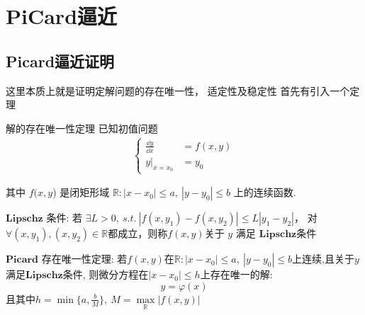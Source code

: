 \newpage
\section{PiCard逼近}
\subsection{Picard逼近证明}

这里本质上就是证明定解问题的存在唯一性， 适定性及稳定性
首先有引入一个定理

\begin{theorem}{解的存在唯一性定理}
已知初值问题
\begin{align}
    \begin{cases}
        \frac{\dd y}{\dd x} &= f(x, y)\\
        y\bigg|_{x=x_0} &= y_0
    \end{cases}
    \label{Orig}
\end{align}


其中 $f(x, y$) 是闭矩形域 $\mathbb{R}:|x-x_0|\le a,~ |y-y_0|\le b$ 上的连续函数.


$\mathbf{Lipschz}$ \textsf{条件:}
若 $\exists L>0, ~ s.t. ~ |f(x, y_1) - f(x, y_2)|\le L|y_1-y_2|$，
对 $\forall (x, y_1), (x, y_2)\in \mathbb{R}$都成立，则称$f(x, y)$关于 $y$ 
满足 $\mathbf{Lipschz}$条件

$\mathbf{Picard}$ \textsf{存在唯一性定理:}
若$f(x, y)$在$\mathbb{R}:|x-x_0|\le a,~ |y-y_0|\le b$上连续,且关于$y$满足$\mathbf{Lipschz}$条件,
则微分方程在$|x-x_0|\le h$上存在唯一的解:
\[
    y = \varphi(x)
\]
且其中$h = \min\{a, \frac{b}{M}\}, ~ M = \max\limits_\mathbb{R} |f(x, y)|$
\end{theorem}



